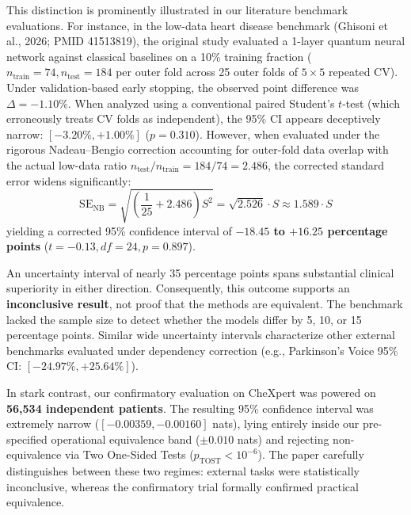 \documentclass[10pt,a4paper]{article}
\begin{document}
This distinction is prominently illustrated in our literature benchmark evaluations. For instance, in the low-data heart disease benchmark (Ghisoni et al., 2026; PMID 41513819), the original study evaluated a 1-layer quantum neural network against classical baselines on a 10\% training fraction ($n_{\text{train}} = 74, n_{\text{test}} = 184$ per outer fold across 25 outer folds of $5 \times 5$ repeated CV). Under validation-based early stopping, the observed point difference was $\Delta = -1.10\%$. When analyzed using a conventional paired Student's $t$-test (which erroneously treats CV folds as independent), the 95\% CI appears deceptively narrow: $[-3.20\%, +1.00\%]$ ($p = 0.310$). However, when evaluated under the rigorous Nadeau--Bengio correction accounting for outer-fold data overlap with the actual low-data ratio $n_{\text{test}} / n_{\text{train}} = 184 / 74 = 2.486$, the corrected standard error widens significantly:
\begin{equation}
\text{SE}_{\text{NB}} = \sqrt{\left(\frac{1}{25} + 2.486\right) S^2} = \sqrt{2.526} \cdot S \approx 1.589 \cdot S
\end{equation}
yielding a corrected 95\% confidence interval of \textbf{$-18.45$ to $+16.25$ percentage points} ($t = -0.13, df = 24, p = 0.897$).

An uncertainty interval of nearly 35 percentage points spans substantial clinical superiority in either direction. Consequently, this outcome supports an \textbf{inconclusive result}, not proof that the methods are equivalent. The benchmark lacked the sample size to detect whether the models differ by 5, 10, or 15 percentage points. Similar wide uncertainty intervals characterize other external benchmarks evaluated under dependency correction (e.g., Parkinson's Voice 95\% CI: $[-24.97\%, +25.64\%]$).

In stark contrast, our confirmatory evaluation on CheXpert was powered on \textbf{56,534 independent patients}. The resulting 95\% confidence interval was extremely narrow ($[-0.00359, -0.00160]$ nats), lying entirely inside our pre-specified operational equivalence band ($\pm 0.010$ nats) and rejecting non-equivalence via Two One-Sided Tests ($p_{\text{TOST}} < 10^{-6}$). The paper carefully distinguishes between these two regimes: external tasks were statistically inconclusive, whereas the confirmatory trial formally confirmed practical equivalence.
\end{document}
